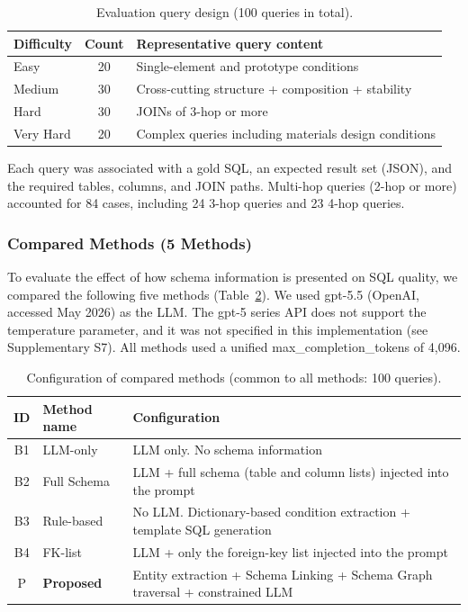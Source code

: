 \documentclass[5p,twocolumn]{elsarticle}
\begin{document}
\begin{table}[htbp]
  \centering
  \caption{Evaluation query design (100 queries in total).}
  \label{tab:query_design}
  \small
  \begin{tabular}{lcl}
    \toprule
    Difficulty & Count & Representative query content \\
    \midrule
    Easy & 20 & Single-element and prototype conditions \\
    Medium & 30 & Cross-cutting structure + composition + stability \\
    Hard & 30 & JOINs of 3-hop or more \\
    Very Hard & 20 & Complex queries including materials design conditions \\
    \bottomrule
  \end{tabular}
\end{table}

Each query was associated with a gold SQL, an expected result set (JSON),
and the required tables, columns, and JOIN paths.
Multi-hop queries (2-hop or more) accounted for 84 cases,
including 24 3-hop queries and 23 4-hop queries.

\subsubsection{Compared Methods (5 Methods)}

To evaluate the effect of how schema information is presented on SQL quality,
we compared the following five methods (Table~\ref{tab:methods}).
We used gpt-5.5 (OpenAI, accessed May 2026) as the LLM.
The gpt-5 series API does not support the temperature parameter, and it was not specified in this implementation (see Supplementary S7).
All methods used a unified max\_completion\_tokens of 4{,}096.

\begin{table}[htbp]
  \centering
  \caption{Configuration of compared methods (common to all methods: 100 queries).}
  \label{tab:methods}
  \small
  \begin{tabularx}{\textwidth}{clX}
    \toprule
    ID & Method name & Configuration \\
    \midrule
    B1 & LLM-only & LLM only. No schema information \\
    B2 & Full Schema & LLM + full schema (table and column lists) injected into the prompt \\
    B3 & Rule-based & No LLM. Dictionary-based condition extraction + template SQL generation \\
    B4 & FK-list & LLM + only the foreign-key list injected into the prompt \\
    P & \textbf{Proposed} & Entity extraction + Schema Linking + Schema Graph traversal + constrained LLM \\
    \bottomrule
  \end{tabularx}
\end{table}
\end{document}
